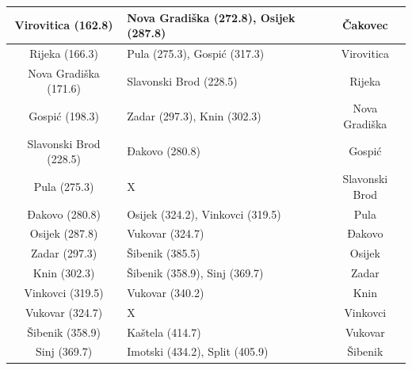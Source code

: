 \documentclass[10pt]{scrartcl}
\begin{document}
\begin{center}
\begin{table}[H]
\begin{tabularx}{1\textwidth}{c X c}
Virovitica (162.8)     & {\color[HTML]{9B9B9B} Nova Gradiška (272.8)}, Osijek (287.8)                            & Čakovec                     \\ \hline
Rijeka (166.3)         & Pula (275.3), {\color[HTML]{656565} Gospić (317.3)}                                     & Virovitica                  \\ \hline
Nova Gradiška (171.6)  & Slavonski Brod (228.5)                                                                  & Rijeka                      \\ \hline
Gospić (198.3)         & Zadar (297.3), Knin (302.3)                                                             & Nova Gradiška               \\ \hline
Slavonski Brod (228.5) & Đakovo (280.8)                                                                          & Gospić                      \\ \hline
Pula (275.3)           & X                                                                                       & Slavonski Brod              \\ \hline
Đakovo (280.8)         & {\color[HTML]{9B9B9B} Osijek (324.2)}, Vinkovci (319.5)                                 & Pula                        \\ \hline
Osijek (287.8)         & Vukovar (324.7)                                                                         & Đakovo                      \\ \hline
Zadar (297.3)          & {\color[HTML]{9B9B9B} Šibenik (385.5)}                                                  & Osijek                      \\ \hline
Knin (302.3)           & Šibenik (358.9), Sinj (369.7)                                                           & Zadar                       \\ \hline
Vinkovci (319.5)       & {\color[HTML]{9B9B9B} Vukovar (340.2)}                                                  & Knin                        \\ \hline
Vukovar (324.7)        & X                                                                                       & Vinkovci                    \\ \hline
Šibenik (358.9)        & Kaštela (414.7)                                                                         & Vukovar                     \\ \hline
Sinj (369.7)           & Imotski (434.2), Split (405.9)                                                          & Šibenik                     \\ \hline

\end{tabularx}
\end{table}
\end{center}
\end{document}
